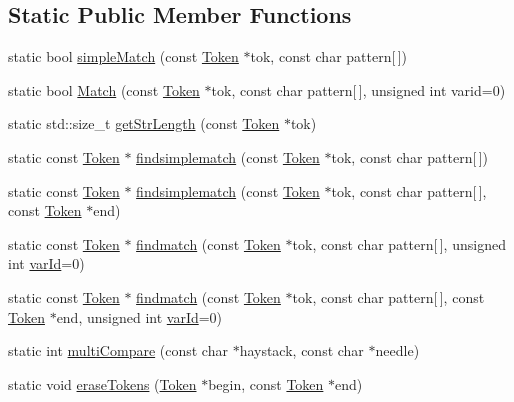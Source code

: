 \subsection*{Static Public Member Functions}
\begin{DoxyCompactItemize}
\item 
static bool \hyperlink{class_token_a0f73cc13be77ebc806962972a8ae8092}{simple\-Match} (const \hyperlink{class_token}{Token} $\ast$tok, const char pattern\mbox{[}$\,$\mbox{]})
\item 
static bool \hyperlink{class_token_a519623098bde6496825e49364575dadf}{Match} (const \hyperlink{class_token}{Token} $\ast$tok, const char pattern\mbox{[}$\,$\mbox{]}, unsigned int varid=0)
\item 
static std\-::size\-\_\-t \hyperlink{class_token_a3fe50caa3292df9132ab5894c322634c}{get\-Str\-Length} (const \hyperlink{class_token}{Token} $\ast$tok)
\item 
static const \hyperlink{class_token}{Token} $\ast$ \hyperlink{class_token_a0b7c3cba682eb1ec914935468d13f909}{findsimplematch} (const \hyperlink{class_token}{Token} $\ast$tok, const char pattern\mbox{[}$\,$\mbox{]})
\item 
static const \hyperlink{class_token}{Token} $\ast$ \hyperlink{class_token_a770b45407b4fe8fa45b32352aca45183}{findsimplematch} (const \hyperlink{class_token}{Token} $\ast$tok, const char pattern\mbox{[}$\,$\mbox{]}, const \hyperlink{class_token}{Token} $\ast$end)
\item 
static const \hyperlink{class_token}{Token} $\ast$ \hyperlink{class_token_a129738123e5ddc405eae3245a1c7d487}{findmatch} (const \hyperlink{class_token}{Token} $\ast$tok, const char pattern\mbox{[}$\,$\mbox{]}, unsigned int \hyperlink{class_token_a42fd6bcafcc8e5a4bd8f45b105211b13}{var\-Id}=0)
\item 
static const \hyperlink{class_token}{Token} $\ast$ \hyperlink{class_token_a8121965cfa2cec3ce0c074299a0219e0}{findmatch} (const \hyperlink{class_token}{Token} $\ast$tok, const char pattern\mbox{[}$\,$\mbox{]}, const \hyperlink{class_token}{Token} $\ast$end, unsigned int \hyperlink{class_token_a42fd6bcafcc8e5a4bd8f45b105211b13}{var\-Id}=0)
\item 
static int \hyperlink{class_token_af62e580087bc1c60f7e07d279716b508}{multi\-Compare} (const char $\ast$haystack, const char $\ast$needle)
\item 
static void \hyperlink{class_token_ade1a6122a5d9a10c24f8d30ac3216491}{erase\-Tokens} (\hyperlink{class_token}{Token} $\ast$begin, const \hyperlink{class_token}{Token} $\ast$end)

\end{DoxyCompactItemize}

